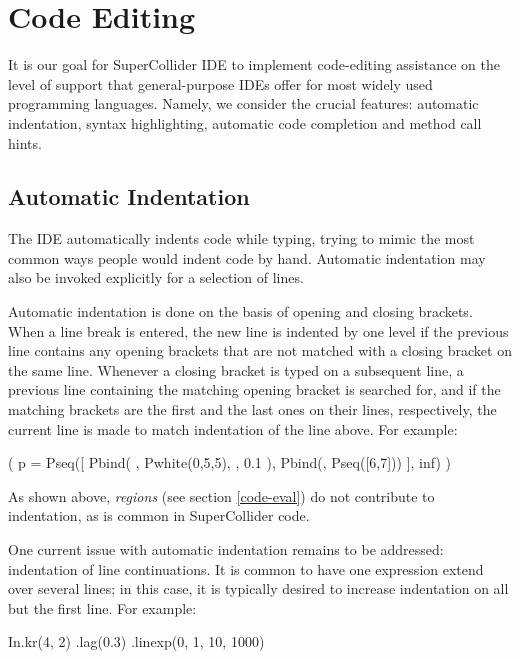 \documentclass[11pt,a4paper]{article}
\begin{document}
\section{Code Editing}

It is our goal for SuperCollider IDE to implement code-editing assistance on the level of support
that general-purpose IDEs offer for most widely used programming languages. Namely,
we consider the crucial features: automatic indentation, syntax highlighting, automatic code completion and method call
hints.

\subsection{Automatic Indentation}

The IDE automatically indents code while typing, trying to mimic the most common ways people would indent code by hand.
Automatic indentation may also be invoked explicitly for a selection of lines.

Automatic indentation is done on the basis of opening and closing brackets. When a line break is entered, the new line
is indented by one level if the previous line contains any opening brackets that are not matched with a closing bracket
on the same line. Whenever a closing bracket is typed on a subsequent line, a previous line containing the matching
opening bracket is searched for, and if the matching brackets are the first and the last ones on their lines,
respectively, the current line is made to match indentation of the line above. For example:

\begin{verbatimtab}[4]
(
p = Pseq([
	Pbind(
		\degree, Pwhite(0,5,5),
		\dur, 0.1
	),
	Pbind(\degree, Pseq([6,7]))
], inf)
)
\end{verbatimtab}

As shown above, \emph{regions} (see section \ref{code-eval}) do not contribute to indentation, as is common in
SuperCollider code.

One current issue with automatic indentation remains to be addressed: indentation of line continuations. It is common
to have one expression extend over several lines; in this case, it is typically desired to increase indentation on all
but the first line. For example:

\begin{verbatimtab}[4]
In.kr(4, 2)
	.lag(0.3)
	.linexp(0, 1, 10, 1000)
\end{verbatimtab}
\end{document}
